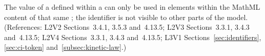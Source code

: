 The  value of a \LocalParameter defined within a \KineticLaw
can only be used in  elements within the MathML content
of that same \KineticLaw; the identifier is not visible to other
parts of the model.  (References: L2V2 Sections~3.4.1, 3.5.3 
and~4.13.5; L2V3 Sections~3.3.1, 3.4.3 and~4.13.5; L2V4 Sections~3.3.1, 
3.4.3 and~4.13.5; L3V1 Sections~\ref{sec:identifiers}, \ref{sec:ci-token}
and~\ref{subsec:kinetic-law}.)
